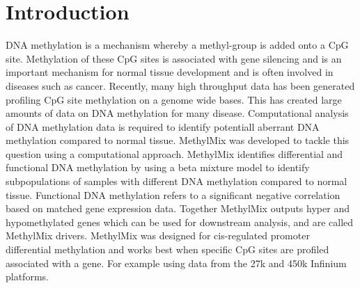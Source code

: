 \documentclass[11pt]{article}
\begin{document}
\section{Introduction}
DNA methylation is a mechanism whereby a methyl-group is added onto a CpG site. 
Methylation of these CpG sites is associated with gene silencing and is an 
important mechanism for normal tissue development and is often involved in 
diseases such as cancer. Recently, many high throughput data has been generated 
profiling CpG site methylation on a genome wide bases. This has created large 
amounts of data on DNA methylation for many disease. Computational analysis of 
DNA methylation data is required to identify potentiall aberrant DNA methylation 
compared to normal tissue. MethylMix was developed to tackle this question using 
a computational approach. MethylMix identifies differential and functional DNA 
methylation by using a beta mixture model to identify subpopulations of samples 
with different DNA methylation compared to normal tissue. Functional DNA 
methylation refers to a significant negative correlation based on matched gene 
expression data. Together MethylMix outputs hyper and hypomethylated genes which 
can be used for downstream analysis, and are called MethylMix drivers. MethylMix 
was designed for cis-regulated promoter differential methylation and works best 
when specific CpG sites are profiled associated with a gene. For example using 
data from the 27k and 450k Infinium platforms. 
\end{document}
